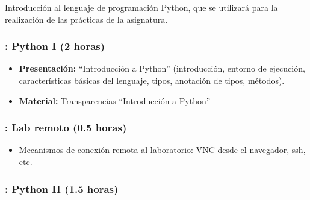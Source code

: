 \documentclass[a4paper,12pt]{article}
\begin{document}
Introducción al lenguaje de programación Python, que se utilizará para la realización de las prácticas de la asignatura.

\subsubsection{\juevesA: Python I (2 horas)}
\label{cal:juevesA}

\begin{itemize}
\item \textbf{Presentación:} ``Introducción a Python'' (introducción, entorno de ejecución, características básicas del lenguaje, tipos, anotación de tipos, métodos).
\item \textbf{Material:} Transparencias ``Introducción a Python''
\end{itemize}

\subsubsection{\juevesB: Lab remoto (0.5 horas)}
\label{cal:juevesB}

\begin{itemize}
\item Mecanismos de conexión remota al laboratorio: VNC desde el navegador, ssh, etc.
\end{itemize}

\subsubsection{\juevesB: Python II (1.5 horas)}
\label{cal:juevesBb}
\end{document}

